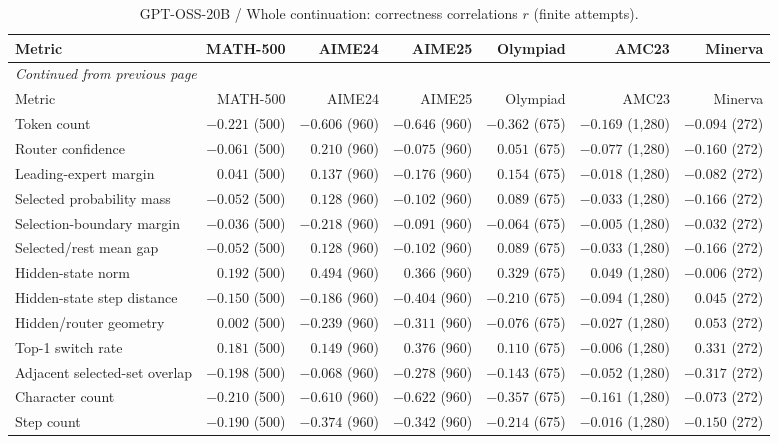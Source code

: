 \begingroup\scriptsize\setlength{\tabcolsep}{4pt}
\begin{longtable}{@{}lrrrrrr@{}}
\caption{GPT-OSS-20B / Whole continuation: correctness correlations $r$ (finite attempts).}\label{tab:multi-gptoss-continuation}\\
\toprule
Metric & MATH-500 & AIME24 & AIME25 & Olympiad & AMC23 & Minerva \\
\midrule\endfirsthead
\multicolumn{7}{l}{\textit{Continued from previous page}}\\
\toprule
Metric & MATH-500 & AIME24 & AIME25 & Olympiad & AMC23 & Minerva \\
\midrule\endhead
\bottomrule\endfoot
Token count & $-0.221$ (500) & $-0.606$ (960) & $-0.646$ (960) & $-0.362$ (675) & $-0.169$ (1,280) & $-0.094$ (272) \\
Router confidence & $-0.061$ (500) & $0.210$ (960) & $-0.075$ (960) & $0.051$ (675) & $-0.077$ (1,280) & $-0.160$ (272) \\
Leading-expert margin & $0.041$ (500) & $0.137$ (960) & $-0.176$ (960) & $0.154$ (675) & $-0.018$ (1,280) & $-0.082$ (272) \\
Selected probability mass & $-0.052$ (500) & $0.128$ (960) & $-0.102$ (960) & $0.089$ (675) & $-0.033$ (1,280) & $-0.166$ (272) \\
Selection-boundary margin & $-0.036$ (500) & $-0.218$ (960) & $-0.091$ (960) & $-0.064$ (675) & $-0.005$ (1,280) & $-0.032$ (272) \\
Selected/rest mean gap & $-0.052$ (500) & $0.128$ (960) & $-0.102$ (960) & $0.089$ (675) & $-0.033$ (1,280) & $-0.166$ (272) \\
Hidden-state norm & $0.192$ (500) & $0.494$ (960) & $0.366$ (960) & $0.329$ (675) & $0.049$ (1,280) & $-0.006$ (272) \\
Hidden-state step distance & $-0.150$ (500) & $-0.186$ (960) & $-0.404$ (960) & $-0.210$ (675) & $-0.094$ (1,280) & $0.045$ (272) \\
Hidden/router geometry & $0.002$ (500) & $-0.239$ (960) & $-0.311$ (960) & $-0.076$ (675) & $-0.027$ (1,280) & $0.053$ (272) \\
Top-1 switch rate & $0.181$ (500) & $0.149$ (960) & $0.376$ (960) & $0.110$ (675) & $-0.006$ (1,280) & $0.331$ (272) \\
Adjacent selected-set overlap & $-0.198$ (500) & $-0.068$ (960) & $-0.278$ (960) & $-0.143$ (675) & $-0.052$ (1,280) & $-0.317$ (272) \\
Character count & $-0.210$ (500) & $-0.610$ (960) & $-0.622$ (960) & $-0.357$ (675) & $-0.161$ (1,280) & $-0.073$ (272) \\
Step count & $-0.190$ (500) & $-0.374$ (960) & $-0.342$ (960) & $-0.214$ (675) & $-0.016$ (1,280) & $-0.150$ (272) \\
\end{longtable}\endgroup

